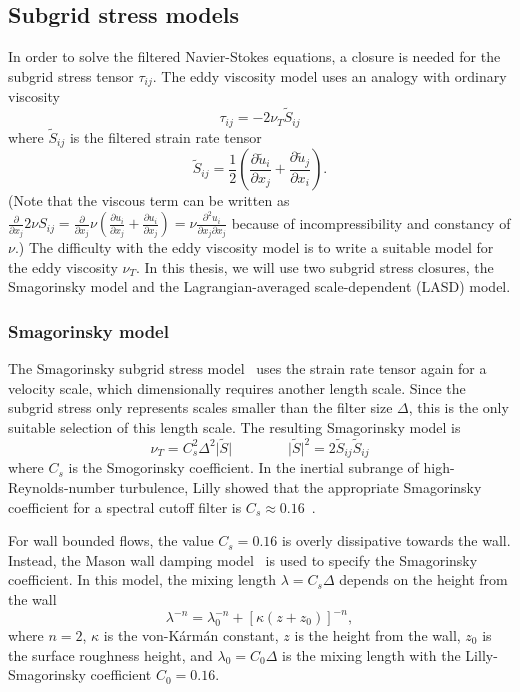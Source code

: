 \subsection{Subgrid stress models}
\label{subsec:methods-les-subgrid}
In order to solve the filtered Navier-Stokes equations, a closure is needed for the subgrid stress tensor $\tau_{ij}$. The eddy viscosity model uses an analogy with ordinary viscosity
\begin{equation}
\tau_{ij} = - 2 \nu_T \tilde{S}_{ij}
\end{equation}
where $\tilde{S}_{ij}$ is the filtered strain rate tensor
\begin{equation}
 \tilde{S}_{ij} = \frac{1}{2}\left( \frac{\partial \tilde{u}_i}{\partial x_j} + \frac{\partial \tilde{u}_j}{\partial x_i}\right).
\end{equation}
(Note that the viscous term can be written as $\frac{\partial}{\partial x_j} 2 \nu S_{ij} = \frac{\partial}{\partial x_j} \nu \left(\frac{\partial u_i}{\partial x_j} + \frac{\partial u_i}{\partial x_j} \right) = \nu \frac{\partial^2 u_i}{\partial x_j \partial x_j}$ because of incompressibility and constancy of $\nu$.) The difficulty with the eddy viscosity model is to write a suitable model for the eddy viscosity $\nu_T$. In this thesis, we will use two subgrid stress closures, the Smagorinsky model and the Lagrangian-averaged scale-dependent (LASD) model.

\subsubsection{Smagorinsky model}
\label{subsubsec:methods-les-subgrid-smag}
The Smagorinsky subgrid stress model~\cite{Smagorinsky1963a} uses the strain rate tensor again for a velocity scale, which dimensionally requires another length scale. Since the subgrid stress only represents scales smaller than the filter size $\Delta$, this is the only suitable selection of this length scale. The resulting Smagorinsky model is 
\begin{equation}
\nu_T = C_s^2 \Delta^2 \vert \tilde{S} \vert \qquad \qquad \vert \tilde{S} \vert^2 = 2 \tilde{S}_{ij} \tilde{S}_{ij}
\end{equation}
where $C_s$ is the Smogorinsky coefficient. In the inertial subrange of high-Reynolds-number turbulence, Lilly showed that the appropriate Smagorinsky coefficient for a spectral cutoff filter is $C_s \approx 0.16$~\cite{Lilly1966b, Pope2000a}.

For wall bounded flows, the value $C_s = 0.16$ is overly dissipative towards the wall. Instead, the Mason wall damping model~\cite{Mason1994a} is used to specify the Smagorinsky coefficient. In this model, the mixing length $\lambda = C_s \Delta$ depends on the height from the wall
\begin{equation}
\lambda^{-n} = \lambda_0^{-n} + \left[\kappa (z + z_0)\right]^{-n},
\end{equation}
where $n =2$, $\kappa$ is the von-K\'{a}rm\'{a}n constant, $z$ is the height from the wall, $z_0$ is the surface roughness height, and $\lambda_0 = C_0 \Delta$ is the mixing length with the Lilly-Smagorinsky coefficient $C_0 = 0.16$.


